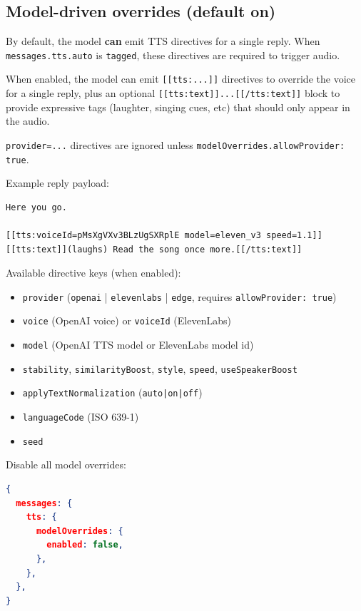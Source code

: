 \subsection{Model-driven overrides (default on)}


By default, the model \textbf{can} emit TTS directives for a single reply.
When \texttt{messages.tts.auto} is \texttt{tagged}, these directives are required to trigger audio.

When enabled, the model can emit \texttt{[[tts:...]]} directives to override the voice
for a single reply, plus an optional \texttt{[[tts:text]]...[[/tts:text]]} block to
provide expressive tags (laughter, singing cues, etc) that should only appear in
the audio.

\texttt{provider=...} directives are ignored unless \texttt{modelOverrides.allowProvider: true}.

Example reply payload:

\begin{lstlisting}
Here you go.

[[tts:voiceId=pMsXgVXv3BLzUgSXRplE model=eleven_v3 speed=1.1]]
[[tts:text]](laughs) Read the song once more.[[/tts:text]]
\end{lstlisting}


Available directive keys (when enabled):

\begin{itemize}
  \item \texttt{provider} (\texttt{openai} | \texttt{elevenlabs} | \texttt{edge}, requires \texttt{allowProvider: true})
  \item \texttt{voice} (OpenAI voice) or \texttt{voiceId} (ElevenLabs)
  \item \texttt{model} (OpenAI TTS model or ElevenLabs model id)
  \item \texttt{stability}, \texttt{similarityBoost}, \texttt{style}, \texttt{speed}, \texttt{useSpeakerBoost}
  \item \texttt{applyTextNormalization} (\texttt{auto|on|off})
  \item \texttt{languageCode} (ISO 639-1)
  \item \texttt{seed}
\end{itemize}


Disable all model overrides:

\begin{lstlisting}[language=json]
{
  messages: {
    tts: {
      modelOverrides: {
        enabled: false,
      },
    },
  },
}
\end{lstlisting}


